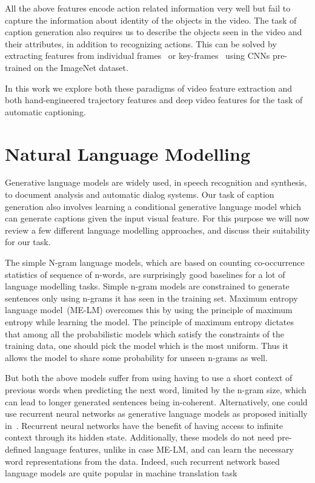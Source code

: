 All the above features encode action related information very well but fail to
capture the information about identity of the objects in the video.
The task of caption generation also requires us to describe the objects seen in
the video and their attributes, in addition to recognizing actions.
This can be solved by extracting features from individual
frames~\cite{venugopalan2015sequence} or key-frames~\cite{shetty2015video} using
CNNs pre-trained on the ImageNet dataset.

In this work we explore both these paradigms of video feature extraction and
both hand-engineered trajectory features and deep video features for the task of
automatic captioning.

\section{Natural Language Modelling}
Generative language models are widely used, in speech recognition and synthesis,
to document analysis and automatic dialog systems.
Our task of caption generation also involves learning a conditional generative language
model which can generate captions given the input visual feature.
For this purpose we will now review a few different language modelling
approaches, and discuss their suitability for our task.

The simple N-gram language models, which are based on counting co-occurrence
statistics of sequence of n-words, are surprisingly good baselines for a lot of
language modelling tasks.
Simple n-gram models are constrained to generate sentences only using n-grams it
has seen in the training set.
Maximum entropy language model~\cite{berger1996maximum}(ME-LM) overcomes this by using
the principle of maximum entropy while learning the model.
The principle of maximum entropy dictates that among all the probabilistic
models which satisfy the constraints of the training data, one should pick the
model which is the most uniform.
Thus it allows the model to share some probability for unseen n-grams as well.

But both the above models suffer from using having to use a short context of previous
words when predicting the next word, limited by the n-gram size, which can lead
to longer generated sentences being in-coherent.
Alternatively, one could use recurrent neural networks as generative language
models as proposed initially in~\cite{sutskever2014sequence}.
Recurrent neural networks have the benefit of having access to infinite context
through its hidden state.
Additionally, these models do not need pre-defined language features, unlike in case
ME-LM, and can learn the necessary word representations from the data. 
Indeed, such recurrent network based language models are quite popular in
machine translation task~\cite{bahdanau2014neural}

